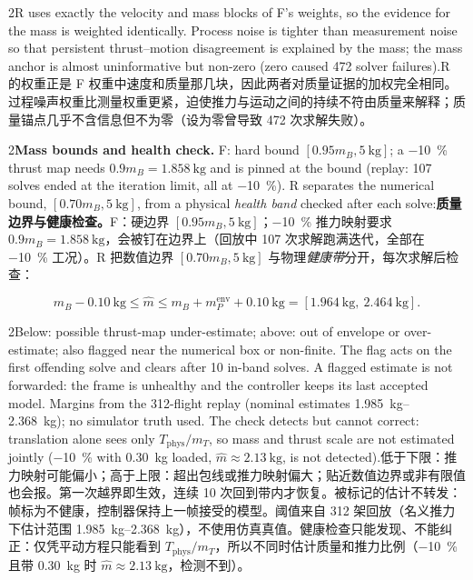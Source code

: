 \documentclass[10pt,a4paper]{article}
\numberwithin{equation}{section}
\newcommand{\mB}{m_B}
\newcommand{\mT}{m_T}
\newcommand{\Tphys}{T_{\mathrm{phys}}}
\newcommand{\pair}[2]{\begin{paracol}{2}#1\switchcolumn #2\end{paracol}}
\begin{document}
\pair{R uses exactly the velocity and mass blocks of F's weights, so the
evidence for the mass is weighted identically. Process noise is tighter than
measurement noise so that persistent thrust--motion disagreement is explained by
the mass; the mass anchor is almost uninformative but non-zero (zero caused 472
solver failures).}
{R 的权重正是 F 权重中速度和质量那几块，因此两者对质量证据的加权完全相同。过程噪声权重比测量权重更紧，迫使推力与运动之间的持续不符由质量来解释；质量锚点几乎不含信息但不为零（设为零曾导致 472 次求解失败）。}

\pair{\textbf{Mass bounds and health check.} F: hard bound
$[0.95\mB,\SI{5}{\kg}]$; a \SI{-10}{\percent} thrust map needs $0.9\mB=\SI{1.858}{\kg}$
and is pinned at the bound (replay: 107 solves ended at the iteration limit, all
at \SI{-10}{\percent}). R separates the numerical bound,
$[0.70\mB,\SI{5}{\kg}]$, from a physical \emph{health band} checked after each solve:}
{\textbf{质量边界与健康检查。}F：硬边界 $[0.95\mB,\SI{5}{\kg}]$；\SI{-10}{\percent} 推力映射要求 $0.9\mB=\SI{1.858}{\kg}$，会被钉在边界上（回放中 107 次求解跑满迭代，全部在 \SI{-10}{\percent} 工况）。R 把数值边界 $[0.70\mB,\SI{5}{\kg}]$ 与物理\emph{健康带}分开，每次求解后检查：}
\begin{equation}
\mB-\SI{0.10}{\kg}\le\hat m\le\mB+m_P^{\mathrm{env}}+\SI{0.10}{\kg}=[\SI{1.964}{\kg},\ \SI{2.464}{\kg}].
\label{eq:healthband}
\end{equation}
\pair{Below: possible thrust-map under-estimate; above: out of envelope or
over-estimate; also flagged near the numerical box or non-finite. The flag acts
on the first offending solve and clears after 10 in-band solves. A flagged
estimate is not forwarded: the frame is unhealthy and the controller keeps its
last accepted model. Margins from the 312-flight replay (nominal estimates
\SIrange{1.985}{2.368}{\kg}); no simulator truth used. The check detects but
cannot correct: translation alone sees only $\Tphys/\mT$, so mass and thrust
scale are not estimated jointly (\SI{-10}{\percent} with \SI{0.30}{\kg} loaded,
$\hat m\approx\SI{2.13}{\kg}$, is not detected).}
{低于下限：推力映射可能偏小；高于上限：超出包线或推力映射偏大；贴近数值边界或非有限值也会报。第一次越界即生效，连续 10 次回到带内才恢复。被标记的估计不转发：帧标为不健康，控制器保持上一帧接受的模型。阈值来自 312 架回放（名义推力下估计范围 \SIrange{1.985}{2.368}{\kg}），不使用仿真真值。健康检查只能发现、不能纠正：仅凭平动方程只能看到 $\Tphys/\mT$，所以不同时估计质量和推力比例（\SI{-10}{\percent} 且带 \SI{0.30}{\kg} 时 $\hat m\approx\SI{2.13}{\kg}$，检测不到）。}
\end{document}
